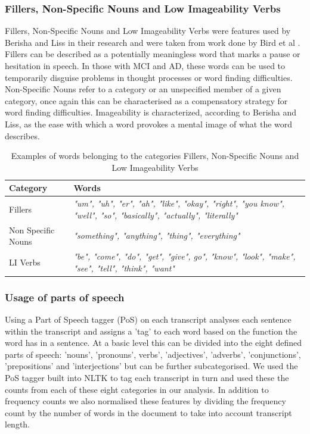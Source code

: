 \documentclass[10pt, letterpaper, twoside, openany]{thesis}
\begin{document}
\subsubsection{Fillers, Non-Specific Nouns and Low Imageability Verbs}
Fillers, Non-Specific Nouns and Low Imageability Verbs were features used by Berisha and Liss in their research \cite{Berisha2015} and were taken from work done by Bird et al \cite{Bird2000}. Fillers can be described as a potentially meaningless word that marks a pause or hesitation in speech. In those with MCI and AD, these words can be used to temporarily disguise problems in thought processes or word finding difficulties. Non-Specific Nouns refer to a category or an unspecified member of a given category, once again this can be characterised as a compensatory strategy for word finding difficulties. Imageability is characterized, according to Berisha and Liss\cite{Berisha2015}, as the ease with which a word provokes a mental image of what the word describes. 

\begin{table}[H]
	\begin{center}
	\begin{tabular}{ | p{3cm} | p{10cm} |}
		\hline
		Category & Words \\ \hline
		Fillers & \textit{"um", "uh", "er", "ah", "like", "okay", "right",  "you know", "well", "so", "basically", "actually", "literally"} \\ \hline
		Non Specific Nouns & \textit{"something", "anything", "thing", "everything"} \\ \hline
		LI Verbs & \textit{"be", "come", "do", "get", "give", go", "know", "look", "make", "see", "tell", "think", "want"} \\ \hline
	\end{tabular}
	\caption{\label{tab:table-name}Examples of words belonging to the categories Fillers, Non-Specific Nouns and Low Imageability Verbs}
	\end{center} 
\end{table}

\subsubsection{Usage of parts of speech}
Using a Part of Speech tagger (PoS) on each transcript analyses each sentence within the transcript and assigns a 'tag' to each word based on the function the word has in a sentence. At a basic level this can be divided into the eight defined parts of speech: 'nouns', 'pronouns', verbs', 'adjectives', 'adverbs', 'conjunctions', 'prepositions' and 'interjections' but can be further subcategorised. We used the PoS tagger built into NLTK to tag each transcript in turn and used these the counts from each of these eight categories in our analysis. In addition to frequency counts we also normalised these features by dividing the frequency count by the number of words in the document to take into account transcript length.
\end{document}
